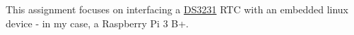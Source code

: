 This assignment focuses on interfacing a \hyperlink{classDS3231}{D\+S3231} R\+TC with an embedded linux device -\/ in my case, a Raspberry Pi 3 B+. 